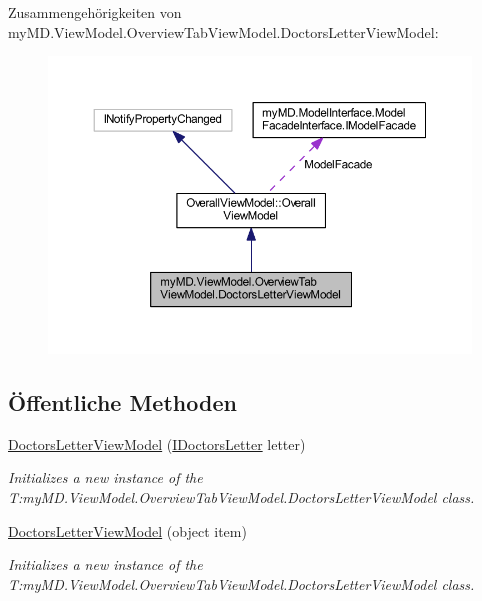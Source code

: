 Zusammengehörigkeiten von my\+M\+D.\+View\+Model.\+Overview\+Tab\+View\+Model.\+Doctors\+Letter\+View\+Model\+:
\nopagebreak
\begin{figure}[H]
\begin{center}
\leavevmode
\includegraphics[width=350pt]{classmy_m_d_1_1_view_model_1_1_overview_tab_view_model_1_1_doctors_letter_view_model__coll__graph}
\end{center}
\end{figure}
\subsection*{Öffentliche Methoden}
\begin{DoxyCompactItemize}
\item 
\mbox{\hyperlink{classmy_m_d_1_1_view_model_1_1_overview_tab_view_model_1_1_doctors_letter_view_model_a587e53a436f0a4472d49493bcdc97f9d}{Doctors\+Letter\+View\+Model}} (\mbox{\hyperlink{interfacemy_m_d_1_1_model_interface_1_1_data_model_interface_1_1_i_doctors_letter}{I\+Doctors\+Letter}} letter)
\begin{DoxyCompactList}\small\item\em Initializes a new instance of the T\+:my\+M\+D.\+View\+Model.\+Overview\+Tab\+View\+Model.\+Doctors\+Letter\+View\+Model class. \end{DoxyCompactList}\item 
\mbox{\hyperlink{classmy_m_d_1_1_view_model_1_1_overview_tab_view_model_1_1_doctors_letter_view_model_ac1266020659a2746aa6f94d2bc4efa3e}{Doctors\+Letter\+View\+Model}} (object item)
\begin{DoxyCompactList}\small\item\em Initializes a new instance of the T\+:my\+M\+D.\+View\+Model.\+Overview\+Tab\+View\+Model.\+Doctors\+Letter\+View\+Model class. \end{DoxyCompactList}\end{DoxyCompactItemize}
